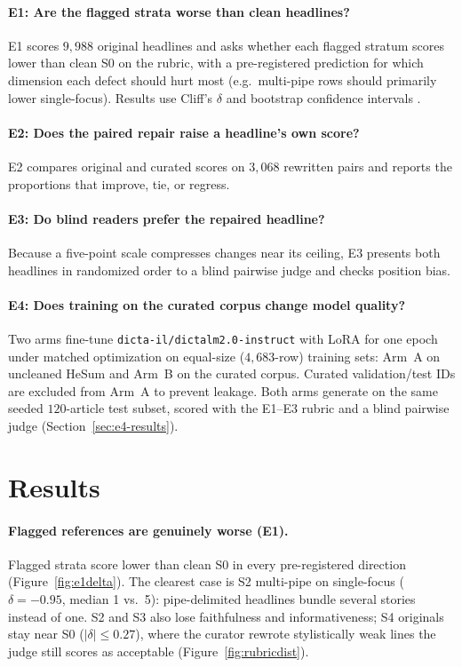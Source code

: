 \documentclass[11pt]{article}
\newcommand{\dictalmtwo}{\texttt{dicta\allowbreak-il/\allowbreak dictalm2.0\allowbreak-instruct}}
\begin{document}
\paragraph{E1: Are the flagged strata worse than clean headlines?}
E1 scores $9{,}988$ original headlines and asks whether each flagged stratum scores lower than
clean S0 on the rubric, with a pre-registered prediction for which dimension each defect should
hurt most (e.g.\ multi-pipe rows should primarily lower single-focus). Results use Cliff's
$\delta$ and bootstrap confidence intervals \citep{cliff1993dominance}.

\paragraph{E2: Does the paired repair raise a headline's own score?}
E2 compares original and curated scores on $3{,}068$ rewritten pairs and reports the proportions that
improve, tie, or regress.

\paragraph{E3: Do blind readers prefer the repaired headline?}
Because a five-point scale compresses changes near its ceiling, E3 presents both headlines in
randomized order to a blind pairwise judge and checks position bias.

\paragraph{E4: Does training on the curated corpus change model quality?}
Two arms fine-tune \dictalmtwo{} with LoRA \citep{hu2022lora} for one epoch under matched
optimization on equal-size ($4{,}683$-row) training sets: Arm~A on uncleaned HeSum and Arm~B on the
curated corpus. Curated validation/test IDs are excluded from Arm~A to prevent leakage. Both arms
generate on the same seeded $120$-article test subset, scored with the E1--E3 rubric and a blind
pairwise judge (Section~\ref{sec:e4-results}).

\section{Results}
\label{sec:results}

\paragraph{Flagged references are genuinely worse (E1).}
Flagged strata score lower than clean S0 in every pre-registered direction (Figure~\ref{fig:e1delta}).
The clearest case is S2 multi-pipe on single-focus ($\delta=-0.95$, median 1 vs.\ 5): pipe-delimited
headlines bundle several stories instead of one. S2 and S3 also lose faithfulness and informativeness;
S4 originals stay near S0 ($|\delta| \le 0.27$), where the curator rewrote stylistically weak lines
the judge still scores as acceptable (Figure~\ref{fig:rubricdist}).
\end{document}
